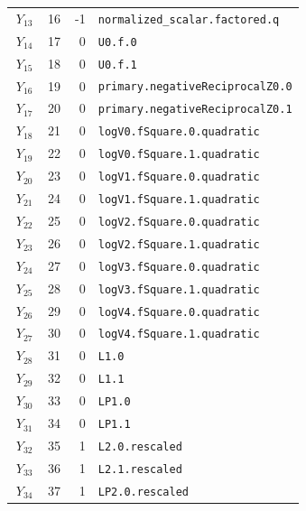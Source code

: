 {\begin{longtable}{@{}r r r p{0.64\linewidth}@{}}
\(Y_{13}\) & 16 & -1 & \texttt{normalized\_scalar.\allowbreak{}factored.\allowbreak{}q} \\
\(Y_{14}\) & 17 & 0 & \texttt{U0.\allowbreak{}f.\allowbreak{}0} \\
\(Y_{15}\) & 18 & 0 & \texttt{U0.\allowbreak{}f.\allowbreak{}1} \\
\(Y_{16}\) & 19 & 0 & \texttt{primary.\allowbreak{}negativeReciprocalZ0.\allowbreak{}0} \\
\(Y_{17}\) & 20 & 0 & \texttt{primary.\allowbreak{}negativeReciprocalZ0.\allowbreak{}1} \\
\(Y_{18}\) & 21 & 0 & \texttt{logV0.\allowbreak{}fSquare.\allowbreak{}0.\allowbreak{}quadratic} \\
\(Y_{19}\) & 22 & 0 & \texttt{logV0.\allowbreak{}fSquare.\allowbreak{}1.\allowbreak{}quadratic} \\
\(Y_{20}\) & 23 & 0 & \texttt{logV1.\allowbreak{}fSquare.\allowbreak{}0.\allowbreak{}quadratic} \\
\(Y_{21}\) & 24 & 0 & \texttt{logV1.\allowbreak{}fSquare.\allowbreak{}1.\allowbreak{}quadratic} \\
\(Y_{22}\) & 25 & 0 & \texttt{logV2.\allowbreak{}fSquare.\allowbreak{}0.\allowbreak{}quadratic} \\
\(Y_{23}\) & 26 & 0 & \texttt{logV2.\allowbreak{}fSquare.\allowbreak{}1.\allowbreak{}quadratic} \\
\(Y_{24}\) & 27 & 0 & \texttt{logV3.\allowbreak{}fSquare.\allowbreak{}0.\allowbreak{}quadratic} \\
\(Y_{25}\) & 28 & 0 & \texttt{logV3.\allowbreak{}fSquare.\allowbreak{}1.\allowbreak{}quadratic} \\
\(Y_{26}\) & 29 & 0 & \texttt{logV4.\allowbreak{}fSquare.\allowbreak{}0.\allowbreak{}quadratic} \\
\(Y_{27}\) & 30 & 0 & \texttt{logV4.\allowbreak{}fSquare.\allowbreak{}1.\allowbreak{}quadratic} \\
\(Y_{28}\) & 31 & 0 & \texttt{L1.\allowbreak{}0} \\
\(Y_{29}\) & 32 & 0 & \texttt{L1.\allowbreak{}1} \\
\(Y_{30}\) & 33 & 0 & \texttt{LP1.\allowbreak{}0} \\
\(Y_{31}\) & 34 & 0 & \texttt{LP1.\allowbreak{}1} \\
\(Y_{32}\) & 35 & 1 & \texttt{L2.\allowbreak{}0.\allowbreak{}rescaled} \\
\(Y_{33}\) & 36 & 1 & \texttt{L2.\allowbreak{}1.\allowbreak{}rescaled} \\
\(Y_{34}\) & 37 & 1 & \texttt{LP2.\allowbreak{}0.\allowbreak{}rescaled} \\

\end{longtable}}
